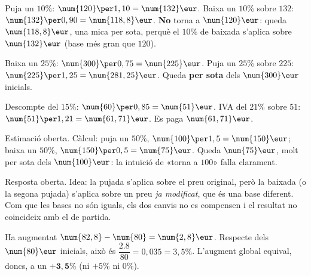\begin{solucions}
\begin{sollist}
  \item Puja un $10\%$: $\num{120}\per 1,10=\num{132}\eur$. Baixa un $10\%$ sobre
        $\num{132}$: $\num{132}\per 0,90=\num{118,8}\eur$. \textbf{No} torna a
        $\num{120}\eur$: queda $\num{118,8}\eur$, una mica per sota, perquè el $10\%$
        de baixada s'aplica sobre $\num{132}\eur$ (base més gran que $\num{120}$).
  \item Baixa un $25\%$: $\num{300}\per 0,75=\num{225}\eur$. Puja un $25\%$ sobre
        $\num{225}$: $\num{225}\per 1,25=\num{281,25}\eur$. Queda \textbf{per sota} dels
        $\num{300}\eur$ inicials.
  \item Descompte del $15\%$: $\num{60}\per 0,85=\num{51}\eur$. IVA del $21\%$ sobre
        $\num{51}$: $\num{51}\per 1,21=\num{61,71}\eur$. Es paga $\num{61,71}\eur$.
  \item Estimació oberta. Càlcul: puja un $50\%$, $\num{100}\per 1,5=\num{150}\eur$;
        baixa un $50\%$, $\num{150}\per 0,5=\num{75}\eur$. Queda $\num{75}\eur$, molt
        per sota dels $\num{100}\eur$: la intuïció de «torna a $\num{100}$» falla
        clarament.
  \item Resposta oberta. Idea: la pujada s'aplica sobre el preu original, però la
        baixada (o la segona pujada) s'aplica sobre un preu \emph{ja modificat}, que és
        una base diferent. Com que les bases no són iguals, els dos canvis no es
        compensen i el resultat no coincideix amb el de partida.
  \item Ha augmentat $\num{82,8}-\num{80}=\num{2,8}\eur$. Respecte dels $\num{80}\eur$
        inicials, això és $\dfrac{\num{2,8}}{\num{80}}=0,035=3,5\%$. L'augment global
        equival, doncs, a un $\mathbf{+3,5\%}$ (ni $+5\%$ ni $0\%$).
\end{sollist}
\end{solucions}
